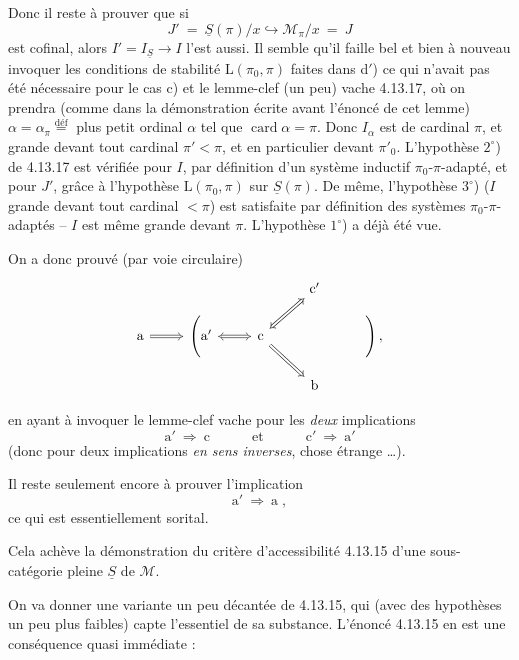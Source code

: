 \documentclass[11pt]{article}
\newcommand{\msp}[1]{\marginpar{\footnotesize [#1]}}
\newcommand{\card}{\operatorname{card}}
\begin{document}
Donc il reste à prouver que si
\[
J' \ = \ \underline{S}(\pi)/x \hookrightarrow \mathcal{M}_\pi/x \ = \ J
\]
est cofinal, alors $I' = I_{\underline{S}} \longrightarrow I$ l'est aussi. Il semble qu'il faille bel et bien à nouveau invoquer les conditions de stabilité $\mathrm{L}(\pi_0,\pi)$ faites dans d$'$) ce qui n'avait pas été nécessaire pour le cas c) et
\msp{page 336}
le lemme-clef (un peu) vache 4.13.17, où on prendra (comme dans la démonstration écrite
avant l'énoncé de cet lemme) %
$\alpha = \alpha_\pi \overset{\text{déf}}{=}$ plus petit ordinal $\alpha$ tel que $\card\alpha = \pi$. Donc $I_\alpha$ est de cardinal $\pi$, et grande devant tout cardinal $\pi' < \pi$, et en particulier devant $\pi'_0$. L'hypothèse $2^\circ$) de 4.13.17 est vérifiée pour $I$, par définition d'un système inductif $\pi_0$-$\pi$-adapté, et pour $J'$, grâce à l'hypothèse $\mathrm{L}(\pi_0,\pi)$ sur $\underline{S}(\pi)$. De même, l'hypothèse $3^\circ$) ($I$ grande devant tout cardinal $< \pi$) est satisfaite par définition des systèmes $\pi_0$-$\pi$-adaptés -- $I$ est même grande devant $\pi$. L'hypothèse $1^\circ$) a déjà été vue.

On a donc prouvé (par voie circulaire)
\[
\begin{tikzcd}[row sep=small]
& & & \mathrm{c}' & \\
\mathrm{a} \arrow[r, Rightarrow] & \Bigg(\mathrm{a}' \arrow[r, Leftrightarrow] & \mathrm{c} \arrow[ur, Leftrightarrow] \arrow[dr, Rightarrow] & & \Bigg)\, , \\ %
& & & \mathrm{b} &
\end{tikzcd}
\]

 en ayant à invoquer le lemme-clef vache pour les \textit{deux} implications
\[
\mathrm{a}' \ \Longrightarrow \ \mathrm{c} \qquad\quad \text{et} \qquad\quad \mathrm{c}' \ \Longrightarrow \ \mathrm{a}'
\]
(donc pour deux implications \textit{en sens inverses}, chose étrange \dots).

\msp{page 337}

Il reste seulement encore à prouver l'implication
\[
\mathrm{a}' \ \Longrightarrow \ \mathrm{a} \; ,
\]
ce qui est essentiellement sorital.

Cela achève la démonstration du critère d'accessibilité 4.13.15 d'une sous-catégorie pleine $\underline{S}$ de $\mathcal{M}$.

On va donner une variante un peu décantée de 4.13.15, qui (avec des hypothèses un peu plus faibles) capte l'essentiel de sa substance. L'énoncé 4.13.15 en est une conséquence quasi immédiate :
\end{document}
